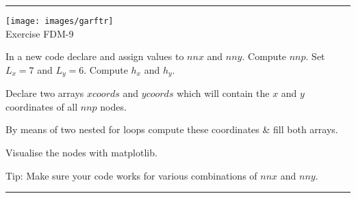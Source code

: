 \begin{center}
\begin{minipage}[t]{0.77\textwidth}
\par\noindent\rule{\textwidth}{0.4pt}

\begin{center}
\texttt{[image: images/garftr]} \\
{\color{orange}Exercise FDM-9}
\end{center}

In a new code declare and assign values to 
$nnx$ and $nny$. Compute $nnp$.
Set $L_x=7$ and $L_y=6$. Compute $h_x$ and $h_y$.

Declare two arrays $xcoords$ and $ycoords$ which will 
contain the $x$ and $y$ coordinates of all $nnp$ nodes.

By means of two nested for loops
compute these coordinates \& fill both arrays. 

Visualise the nodes with matplotlib.

Tip: Make sure your code works for various 
combinations of $nnx$ and $nny$.

\par\noindent\rule{\textwidth}{0.4pt}
\end{minipage}
\end{center}






